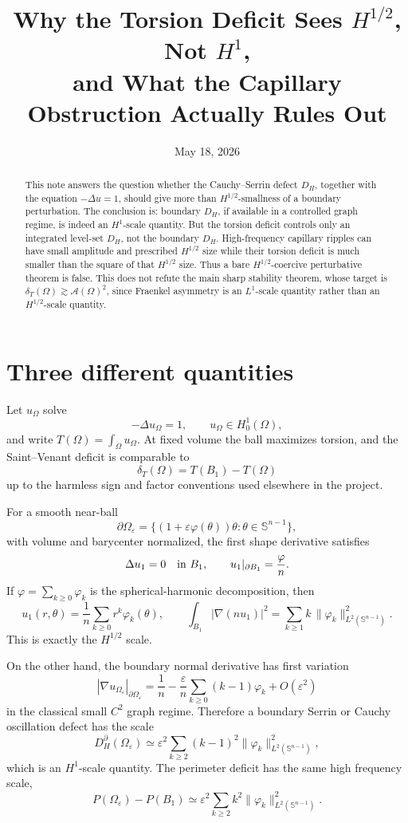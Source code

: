 \documentclass[11pt]{article}
\title{Why the Torsion Deficit Sees \(H^{1/2}\), Not \(H^1\),\\
and What the Capillary Obstruction Actually Rules Out}
\author{}
\date{May 18, 2026}
\newcommand{\Om}{\Omega}
\newcommand{\B}{B_1}
\newcommand{\Sph}{\mathbb S^{n-1}}
\newcommand{\eps}{\varepsilon}
\newcommand{\dT}{\delta_T}
\begin{document}
\maketitle

\begin{abstract}
This note answers the question whether the Cauchy--Serrin defect \(D_H\),
together with the equation \(-\Delta u=1\), should give more than
\(H^{1/2}\)-smallness of a boundary perturbation.  The conclusion is:
boundary \(D_H\), if available in a controlled graph regime, is indeed an
\(H^1\)-scale quantity.  But the torsion deficit controls only an integrated
level-set \(D_H\), not the boundary \(D_H\).  High-frequency capillary ripples
can have small amplitude and prescribed \(H^{1/2}\) size while their torsion
deficit is much smaller than the square of that \(H^{1/2}\) size.  Thus a
bare \(H^{1/2}\)-coercive perturbative theorem is false.  This does not refute
the main sharp stability theorem, whose target is
\(\dT(\Om)\gtrsim\mathcal A(\Om)^2\), since Fraenkel asymmetry is an
\(L^1\)-scale quantity rather than an \(H^{1/2}\)-scale quantity.
\end{abstract}

\section{Three different quantities}

Let \(u_\Om\) solve
\[
   -\Delta u_\Om=1,\qquad u_\Om\in H^1_0(\Om),
\]
and write \(T(\Om)=\int_\Om u_\Om\).  At fixed volume the ball maximizes
torsion, and the Saint--Venant deficit is comparable to
\[
   \dT(\Om)=T(\B)-T(\Om)
\]
up to the harmless sign and factor conventions used elsewhere in the project.

For a smooth near-ball
\[
   \partial\Om_\eps=\{(1+\eps\varphi(\theta))\theta:\theta\in\Sph\},
\]
with volume and barycenter normalized, the first shape derivative satisfies
\[
   \Delta u_1=0\quad\hbox{in }\B,\qquad
   u_1|_{\partial\B}=\frac{\varphi}{n}.
\]
If \(\varphi=\sum_{k\ge0}\varphi_k\) is the spherical-harmonic decomposition,
then
\[
   u_1(r,\theta)=\frac1n\sum_{k\ge0}r^k\varphi_k(\theta),
   \qquad
   \int_{\B}|\nabla(nu_1)|^2
      =\sum_{k\ge1} k\,\|\varphi_k\|_{L^2(\Sph)}^2.
\]
This is exactly the \(H^{1/2}\) scale.

On the other hand, the boundary normal derivative has first variation
\[
   |\nabla u_{\Om_\eps}|_{\partial\Om_\eps}
   =\frac1n-\frac{\eps}{n}\sum_{k\ge0}(k-1)\varphi_k+O(\eps^2)
\]
in the classical small \(C^2\) graph regime.  Therefore a boundary Serrin or
Cauchy oscillation defect has the scale
\[
   D_H^{\partial}(\Om_\eps)
      \simeq \eps^2\sum_{k\ge2}(k-1)^2
             \|\varphi_k\|_{L^2(\Sph)}^2,
\]
which is an \(H^1\)-scale quantity.  The perimeter deficit has the same high
frequency scale,
\[
   P(\Om_\eps)-P(\B)\simeq
   \eps^2\sum_{k\ge2}k^2\|\varphi_k\|_{L^2(\Sph)}^2.
\]
\end{document}
